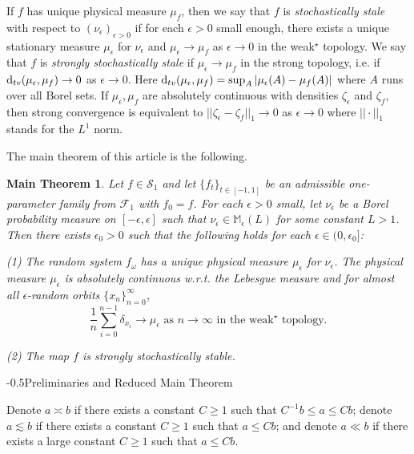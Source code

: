 \documentclass[11pt,oneside]{article}
\makeatletter
\theoremstyle{plain}
\newtheorem*{nonametheorem}{Main Theorem}
\numberwithin{equation}{section}
\numberwithin{figure}{section}
\numberwithin{table}{section}
\renewcommand{\section}{\@startsection{section}{1}{0mm}
{-\baselineskip}{0.5\baselineskip}{\Large\bf\leftline}}
\makeatother
\begin{document}
If $f$ has unique physical measure $\mu_f$, then we say that $f$ is {\it stochastically stale} with respect to $(\nu_{\epsilon})_{\epsilon >0}$ if for each $\epsilon >0$ small enough, there exists a unique stationary measure $\mu_{\epsilon}$ for $\nu_{\epsilon}$ and $\mu_{\epsilon} \to \mu_f$ as $\epsilon \to 0$ in the weak$^{\star}$ topology. We say that $f$ is {\it strongly stochastically stale} if $\mu_{\epsilon} \to \mu_f$ in the strong topology, i.e. if ${\rm d}_{tv}(\mu_{\epsilon}, \mu_f) \to 0$ as $\epsilon \to 0$. Here ${\rm d}_{tv}(\mu_{\epsilon}, \mu_f) = \sup_A | \mu_{\epsilon}(A) - \mu_f(A) |$ where $A$ runs over all Borel sets. If $\mu_{\epsilon}, \mu_f$ are absolutely continuous with densities $\zeta_{\epsilon}$ and $\zeta_{f}$, then strong convergence is equivalent to $|| \zeta_{\epsilon} - \zeta_f ||_1 \to 0$ as $\epsilon \to 0$ where $|| \cdot ||_1$ stands for the $L^1$ norm.


The main theorem of this article is the following.


\begin{nonametheorem}

Let $f \in \mathcal S_1$ and let $\{ f_t \}_{t \in [-1, 1]} $ be an admissible one-parameter family from $\mathscr F_1$ with $f_0 = f$. For each $\epsilon > 0$ small, let $\nu_{\epsilon}$ be a Borel probability measure on $[-\epsilon, \epsilon]$ such that $\nu_{\epsilon} \in \mathbb M_{\epsilon}(L)$ for some constant $L>1$. Then there exists $\epsilon_0>0$ such that the following holds for each $\epsilon \in (0, \epsilon_0]$:

(1) The random system $f_{\omega}$ has a unique physical measure $\mu_{\epsilon}$ for $\nu_{\epsilon}$. The physical measure $\mu_{\epsilon}$ is absolutely continuous w.r.t. the Lebesgue measure and for almost all $\epsilon$-random orbits $\{ x_n \}_{n=0}^{\infty}$,
\[
\frac{1}{n} \sum_{i=0}^{n-1} \delta_{x_i} \to \mu_{\epsilon} \text{ as $n \to \infty$ in the weak$^{\star}$ topology}.
\]


(2) The map $f$ is strongly stochastically stable.
\end{nonametheorem}





\section{Preliminaries and Reduced Main Theorem}




Denote $a \asymp b$ if there exists a constant $C \geq 1$ such that $C^{-1} b \leq a \leq C b$;  denote $a \lesssim b$ if there exists a constant $C \geq 1$ such that $ a \leq C b$; and denote $a \ll b$ if there exists a large constant $C \geq 1$ such that $a \leq C b$.
\end{document}
